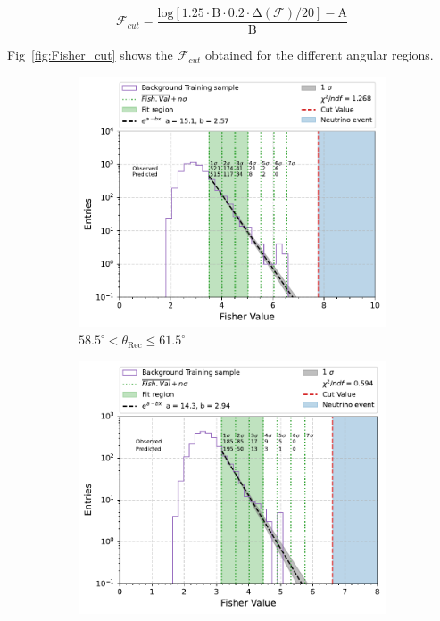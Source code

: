 \begin{equation}
  \label{eq:fisher_poly_cut}
  \mathcal{F}_{cut} = \mathrm{\frac{log[1.25 \cdot B \cdot 0.2 \cdot \Delta (\mathcal{F}) / 20] - A}{B} }
\end{equation}

Fig~\ref{fig:Fisher_cut} shows the $\mathcal{F}_{cut}$ obtained for the different angular regions. 
\begin{figure}[h!]
  \centering
   \begin{subfigure}[l]{.48\textwidth}
     \centering
     \includegraphics[width=\linewidth]{thesis_figures/Nu_analysis/Fisher_plots/Fisher_fit_region_58.5_61.5.pdf}
     \caption{$ 58.5^{\circ} <\theta_{\text{Rec}} \leq 61.5^{\circ}$}
     \label{fig:GEM1_after_prev}
   \end{subfigure}
   \begin{subfigure}[r]{.48\textwidth}
     \centering
     \includegraphics[width=\linewidth]{thesis_figures/Nu_analysis/Fisher_plots/Fisher_fit_region_61.5_64.5.pdf}

\end{subfigure}
\end{figure}
